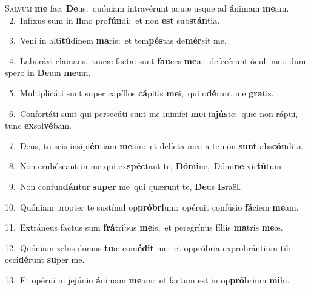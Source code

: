 \lettrine{\initial\textcolor{\initialcolor}{S}}{alvum} \textbf{me} fac, \textbf{De}\-us:~\star quóniam intravérunt aquæ usque ad \textbf{á}\-nimam \textbf{me}\-am.\\
{\numbfont\textcolor{\numbcolor}{~2.}}~Infíxus sum in \textbf{li}\-mo pro\-\textbf{fún}\-di:~\star et non \textbf{est} sub\-\textbf{stán}\-tia.\par
{\numbfont\textcolor{\numbcolor}{~3.}}~Veni in alti\-\textbf{tú}\-dinem \textbf{ma}\-ris:~\star et tem\-\textbf{pés}\-tas de\-\textbf{mér}\-sit me.\par
{\numbfont\textcolor{\numbcolor}{~4.}}~Laborávi clamans, raucæ factæ sunt \textbf{fau}\-ces \textbf{me}\-æ:~\star defecérunt óculi mei, dum spero in \textbf{De}\-um \textbf{me}\-um.\par
{\numbfont\textcolor{\numbcolor}{~5.}}~Multiplicáti sunt super capíllos \textbf{cá}\-pitis \textbf{me}\-i,~\star qui o\-\textbf{dé}\-runt me \textbf{gra}\-tis.\par
{\numbfont\textcolor{\numbcolor}{~6.}}~Confortáti sunt qui persecúti sunt me inimíci \textbf{me}\-i in\-\textbf{jús}\-te:~\star quæ non rápui, tunc \textbf{ex}\-sol\-\textbf{vé}\-bam.\par
{\numbfont\textcolor{\numbcolor}{~7.}}~Deus, tu scis insipi\-\textbf{én}\-tiam \textbf{me}\-am:~\star et delícta mea a te non \textbf{sunt} abs\-\textbf{cón}\-dita.\par
{\numbfont\textcolor{\numbcolor}{~8.}}~Non erubéscant in me qui ex\-\textbf{spéc}\-tant te, \textbf{Dó}\-\textbf{mi}ne,~\star Dómi\textbf{ne} vir\-\textbf{tú}\-tum\par
{\numbfont\textcolor{\numbcolor}{~9.}}~Non confun\-\textbf{dán}\-tur \textbf{su}\-\textbf{per} me~\star qui quærunt te, \textbf{De}\-us \textbf{Is}\-raël.\par
{\numbfont\textcolor{\numbcolor}{10.}}~Quóniam propter te sustínu\textbf{i} op\-\textbf{pró}\-\textbf{bri}um:~\star opéruit confúsio \textbf{fá}\-ciem \textbf{me}\-am.\par
{\numbfont\textcolor{\numbcolor}{11.}}~Extráneus factus sum \textbf{frá}\-tribus \textbf{me}\-is,~\star et peregrínus fíliis \textbf{ma}\-tris \textbf{me}\-æ.\par
{\numbfont\textcolor{\numbcolor}{12.}}~Quóniam zelus domus \textbf{tu}\-æ com\-\textbf{é}\-\textbf{dit} me:~\star et oppróbria exprobrántium tibi ceci\-\textbf{dé}\-runt \textbf{su}\-per me.\par
{\numbfont\textcolor{\numbcolor}{13.}}~Et opérui in jejúnio \textbf{á}\-nimam \textbf{me}\-am:~\star et factum est in op\-\textbf{pró}\-brium \textbf{mi}\-hi.\par
